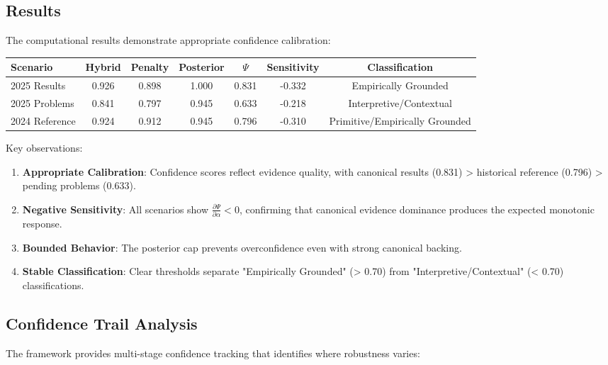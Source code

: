 \documentclass[12pt,a4paper]{article}
\newcommand{\alloc}{\alpha}
\newcommand{\score}{\Psi}
\begin{document}
\subsection{Results}

The computational results demonstrate appropriate confidence calibration:

\begin{center}
\begin{tabular}{@{}lcccccc@{}}
\toprule
Scenario & Hybrid & Penalty & Posterior & $\score$ & Sensitivity & Classification \\
\midrule
2025 Results & 0.926 & 0.898 & 1.000 & 0.831 & -0.332 & Empirically Grounded \\
2025 Problems & 0.841 & 0.797 & 0.945 & 0.633 & -0.218 & Interpretive/Contextual \\
2024 Reference & 0.924 & 0.912 & 0.945 & 0.796 & -0.310 & Primitive/Empirically Grounded \\
\bottomrule
\end{tabular}
\end{center}

Key observations:

\begin{enumerate}
\item \textbf{Appropriate Calibration}: Confidence scores reflect evidence quality, with canonical results (0.831) > historical reference (0.796) > pending problems (0.633).

\item \textbf{Negative Sensitivity}: All scenarios show $\frac{\partial \score}{\partial \alloc} < 0$, confirming that canonical evidence dominance produces the expected monotonic response.

\item \textbf{Bounded Behavior}: The posterior cap prevents overconfidence even with strong canonical backing.

\item \textbf{Stable Classification}: Clear thresholds separate "Empirically Grounded" (> 0.70) from "Interpretive/Contextual" (< 0.70) classifications.
\end{enumerate}

\subsection{Confidence Trail Analysis}

The framework provides multi-stage confidence tracking that identifies where robustness varies:
\end{document}
